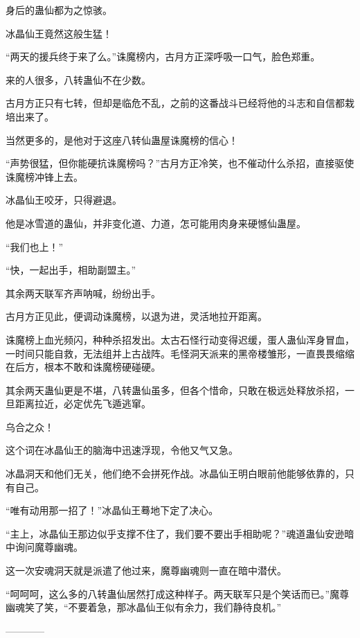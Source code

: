 \begin{this_body}
身后的蛊仙都为之惊骇。

冰晶仙王竟然这般生猛！

“两天的援兵终于来了么。”诛魔榜内，古月方正深呼吸一口气，脸色郑重。

来的人很多，八转蛊仙不在少数。

古月方正只有七转，但却是临危不乱，之前的这番战斗已经将他的斗志和自信都栽培出来了。

当然更多的，是他对于这座八转仙蛊屋诛魔榜的信心！

“声势很猛，但你能硬抗诛魔榜吗？”古月方正冷笑，也不催动什么杀招，直接驱使诛魔榜冲锋上去。

冰晶仙王咬牙，只得避退。

他是冰雪道的蛊仙，并非变化道、力道，怎可能用肉身来硬憾仙蛊屋。

“我们也上！”

“快，一起出手，相助副盟主。”

其余两天联军齐声呐喊，纷纷出手。

古月方正见此，便调动诛魔榜，以退为进，灵活地拉开距离。

诛魔榜上血光频闪，种种杀招发出。太古石怪行动变得迟缓，蛋人蛊仙浑身冒血，一时间只能自救，无法组并上古战阵。毛怪洞天派来的黑帝楼雏形，一直畏畏缩缩在后方，根本不敢和诛魔榜硬碰硬。

其余两天蛊仙更是不堪，八转蛊仙虽多，但各个惜命，只敢在极远处释放杀招，一旦距离拉近，必定优先飞遁逃窜。

乌合之众！

这个词在冰晶仙王的脑海中迅速浮现，令他又气又急。

冰晶洞天和他们无关，他们绝不会拼死作战。冰晶仙王明白眼前他能够依靠的，只有自己。

“唯有动用那一招了！”冰晶仙王蓦地下定了决心。

“主上，冰晶仙王那边似乎支撑不住了，我们要不要出手相助呢？”魂道蛊仙安逊暗中询问魔尊幽魂。

这一次安魂洞天就是派遣了他过来，魔尊幽魂则一直在暗中潜伏。

“呵呵呵，这么多的八转蛊仙居然打成这种样子。两天联军只是个笑话而已。”魔尊幽魂笑了笑，“不要着急，那冰晶仙王似有余力，我们静待良机。”

------------

\end{this_body}

